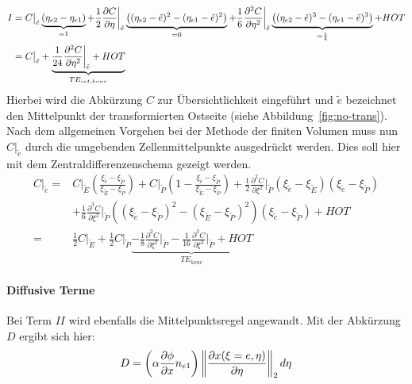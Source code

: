 \begin{align*}
  I&= C\big\vert_{\tilde{e}} \underbrace{(\etaii-\etai)}_{=1} + \frac{1}{2} \pder[C]{\eta}\bigg\vert_{\tilde{e}}
  \underbrace{\left({(\etaii-\etilde)^2-(\etai-\etilde)^2}\right)}_{=0}
  +\frac{1}{6} \frac{\partial^2 C}{\partial \eta^2}\bigg\vert_{\tilde{e}}
  \underbrace{\left({(\etaii-\etilde)^3-(\etai-\etilde)^3}\right)}_{=\frac{1}{4}} + HOT\\
  &= C \big\vert_{\tilde{e}}+ \underbrace{\frac{1}{24}  \frac{\partial^2 C}{\partial \eta^2}
\bigg\vert_{\tilde{e}}+HOT}_{TE_{int,konv}}
\end{align*}
Hierbei wird die Abkürzung $C$ zur Übersichtlichkeit eingeführt und $\tilde{e}$ bezeichnet den Mittelpunkt
der transformierten Ostseite (siehe Abbildung~\ref{fig:no-trans}).  Nach dem allgemeinen Vorgehen bei der
Methode der finiten Volumen muss nun $C\vert_{\tilde{e}}$ durch die umgebenden Zellenmittelpunkte ausgedrückt werden.
Dies soll hier mit dem Zentraldifferenzenschema gezeigt werden.
\begin{align*}
   C\big\vert_{\tilde{e}}
   =& C\big\vert_{\tilde{E}}
   \left({\frac{\xi_{\tilde{e}}-\xi_{\tilde{P}}}{\xi_{\tilde{E}}-\xi_{\tilde{P}}}}\right)
   + C\big\vert_{\tilde{P}} \left({1-\frac{\xi_{\tilde{e}}-\xi_{\tilde{P}}}{\xi_{\tilde{E}}-\xi_{\tilde{P}}} }\right)
   + \frac{1}{2} \frac{\partial^2 C}{\partial \xi^2}\bigg\vert_{\tilde{P}}
   (\xi_{\tilde{e}}-\xi_{\tilde{E}})(\xi_{\tilde{e}}-\xi_{\tilde{P}})\\
   &+ \frac{1}{6}  \frac{\partial^3 C}{\partial \xi^3}\bigg\vert_{\tilde{P}}
   \left({(\xi_{\tilde{e}}-\xi_{\tilde{P}})^2-(\xi_{\tilde{E}}-\xi_{\tilde{P}})^2}\right)
   (\xi_{\tilde{e}}-\xi_{\tilde{P}}) + HOT\\
   =&\frac{1}{2} C \big\vert_{\tilde{E}} + \frac{1}{2} C \big\vert_{\tilde{P}}
   \underbrace{- \frac{1}{8} \frac{\partial^2 C}{\partial \xi^2}\bigg\vert_{\tilde{P}}
   - \frac{1}{16} \frac{\partial^3 C}{\partial \xi^3}\bigg\vert_{\tilde{P}} + HOT}_{TE_{konv}}
\end{align*}



\paragraph{Diffusive Terme}
Bei Term $II$ wird ebenfalls die Mittelpunktsregel angewandt. Mit der Abkürzung $D$
ergibt sich hier:
\begin{equation*}
  D=  \left({\alpha \pder[\phi]{x} n_{e1}}\right)
  \left\lVert \frac{\partial x(\xi=e, \eta)}{\partial \eta} \right\rVert_2 d\eta
\end{equation*}

